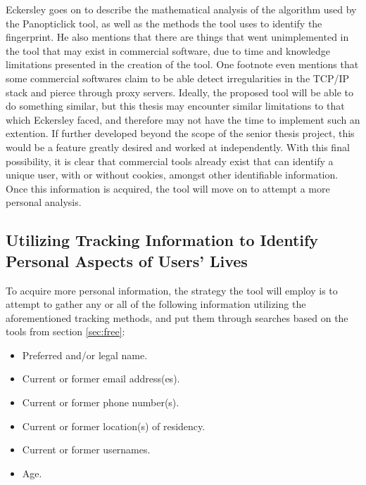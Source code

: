 \documentclass[11pt]{article}
\begin{document}
Eckersley goes on to describe the mathematical analysis of the algorithm used by the Panopticlick tool, as well as the methods the tool uses to identify the fingerprint. He also mentions that there are things that went unimplemented in the tool that may exist in commercial software, due to time and knowledge limitations presented in the creation of the tool. One footnote even mentions that some commercial softwares claim to be able detect irregularities in the TCP/IP stack and pierce through proxy servers. Ideally, the proposed tool will be able to do something similar, but this thesis may encounter similar limitations to that which Eckersley faced, and therefore may not have the time to implement such an extention. If further developed beyond the scope of the senior thesis project, this would be a feature greatly desired and worked at independently. With this final possibility, it is clear that commercial tools already exist that can identify a unique user, with or without cookies, amongst other identifiable information. Once this information is acquired, the tool will move on to attempt a more personal analysis.

\subsection{Utilizing Tracking Information to Identify Personal Aspects of Users' Lives} \label{sec:utilizing}
To acquire more personal information, the strategy the tool will employ is to attempt to gather any or all of the following information utilizing the aforementioned tracking methods, and put them through searches based on the tools from section \ref{sec:free}:

\begin{itemize}
\item Preferred and/or legal name.
\item Current or former email address(es).
\item Current or former phone number(s).
\item Current or former location(s) of residency.
\item Current or former usernames.
\item Age.
\end{itemize}
\end{document}
